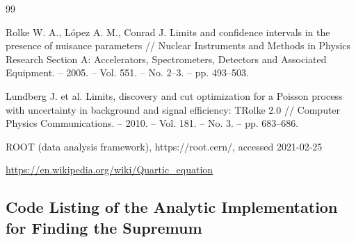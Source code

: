 \documentclass[12pt]{article}
\begin{document}
\begin{thebibliography}{99}

Rolke W. A., López A. M., Conrad J. Limits and confidence intervals in the presence of nuisance parameters // Nuclear Instruments and Methods in Physics Research Section A: Accelerators, Spectrometers, Detectors and Associated Equipment. – 2005. – Vol. 551. – No. 2–3. – pp. 493–503.

Lundberg J. et al. Limits, discovery and cut optimization for a Poisson process with uncertainty in background and signal efficiency: TRolke 2.0 // Computer Physics Communications. – 2010. – Vol. 181. – No. 3. – pp. 683–686.

ROOT (data analysis framework), https://root.cern/, accessed 2021-02-25

\url{https://en.wikipedia.org/wiki/Quartic_equation}

\end{thebibliography}

\newpage

\subsection{Code Listing of the Analytic Implementation for Finding the Supremum}
\end{document}

